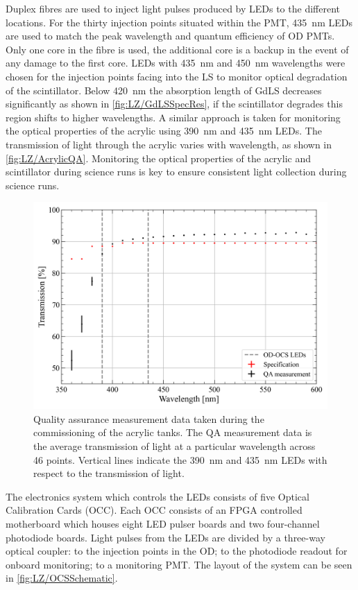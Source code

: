 Duplex fibres are used to inject light pulses produced by LEDs to the different locations. For the thirty injection points situated within the PMT, 435~nm LEDs are used to match the peak wavelength and quantum efficiency of OD PMTs. Only one core in the fibre is used, the additional core is a backup in the event of any damage to the first core. LEDs with 435~nm and 450~nm wavelengths were chosen for the injection points facing into the LS to monitor optical degradation of the scintillator. Below 420~nm the absorption length of GdLS decreases significantly as shown in \autoref{fig:LZ/GdLSSpecRes}, if the scintillator degrades this region shifts to higher wavelengths. A similar approach is taken for monitoring the optical properties of the acrylic using 390~nm and 435~nm LEDs. The transmission of light through the acrylic varies with wavelength, as shown in \autoref{fig:LZ/AcrylicQA}. Monitoring the optical properties of the acrylic and scintillator during science runs is key to ensure consistent light collection during science runs.
\begin{figure}[!ht]
    \centering
    \includegraphics[width=0.7\linewidth]{figures/LZ/T187-XDM-UVT_WAVELENGHT_08252017.png}
    \caption{Quality assurance measurement data taken during the commissioning of the acrylic tanks. The QA measurement data is the average transmission of light at a particular wavelength across 46 points. Vertical lines indicate the 390~nm and 435~nm LEDs with respect to the transmission of light.}
    \label{fig:LZ/AcrylicQA}
\end{figure}
The electronics system which controls the LEDs consists of five Optical Calibration Cards (OCC). Each OCC consists of an FPGA controlled motherboard which houses eight LED pulser boards and two four-channel photodiode boards. Light pulses from the LEDs are divided by a three-way optical coupler: to the injection points in the OD; to the photodiode readout for onboard monitoring; to a monitoring PMT. The layout of the system can be seen in \autoref{fig:LZ/OCSSchematic}.
